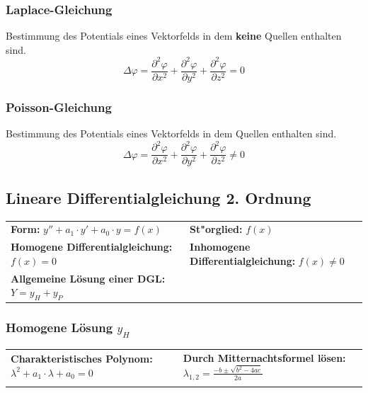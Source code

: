 \subsubsection{Laplace-Gleichung }
Bestimmung des Potentials eines Vektorfelds in dem \textbf{keine} Quellen enthalten sind.
\[ \Delta \varphi = \dfrac{\partial^2 \varphi}{\partial x^2} +  \dfrac{\partial^2 \varphi}{\partial y^2} + \dfrac{\partial^2 \varphi}{\partial z^2} = 0 \]
\subsubsection{Poisson-Gleichung }
Bestimmung des Potentials eines Vektorfelds in dem Quellen enthalten sind.
\[ \Delta \varphi = \dfrac{\partial^2 \varphi}{\partial x^2} +  \dfrac{\partial^2 \varphi}{\partial y^2} + \dfrac{\partial^2 \varphi}{\partial z^2} \neq 0 \]
\clearpage
\pagebreak
\subsection{Lineare Differentialgleichung 2. Ordnung }
\renewcommand{\arraystretch}{1.2}
\begin{tabular}{p{8cm}p{8cm}}
	\textbf{Form:} $y''+a_1\cdot y'+a_0\cdot y=f(x)$  &
	\textbf{St"orglied:} $f(x)$\\
	\textbf{Homogene Differentialgleichung:} $f(x)=0$ &
	\textbf{Inhomogene Differentialgleichung:} $f(x)\neq 0$\\
	\textbf{Allgemeine Lösung einer DGL: }	$Y=y_H+y_P$& \\
\end{tabular}

\subsubsection{Homogene Lösung $y_H$}
\begin{tabular}{p{8cm}p{8cm}}
	\textbf{Charakteristisches Polynom:}\newline
	$\lambda^2+a_1\cdot\lambda+a_0=0$&	
	\textbf{Durch Mitternachtsformel lösen: }\newline
	$\lambda_{1,2}={\frac {-b\pm {\sqrt {b^{2}-4ac}}}{2a}}$\\\\
	
\end{tabular}


